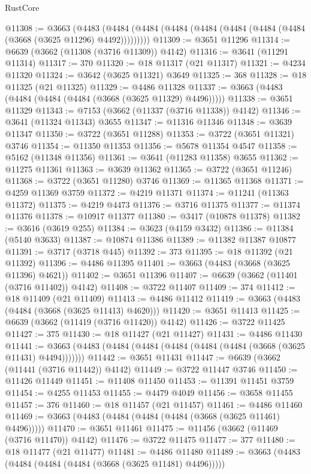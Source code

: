 \begin{lexlean}{RustCore}
\begin{coremodule}
@11308 := @3663
    (@4483 (@4484 (@4484 (@4484 (@4484 (@4484 (@4484 (@4484 (@3668 (@3625 @11296) @4492)))))))))
@11309 := @3651 @11296
@11314 := @6639 (@3662 (@11308 (@3716 @11309)) @4142)
@11316 := @3641 (@11291 @11314)
@11317 := 370
@11320 := @18 @11317 (@21 @11317)
@11321 := @4234 @11320
@11324 := @3642 (@3625 @11321) @3649
@11325 := 368
@11328 := @18 @11325 (@21 @11325)
@11329 := @4486 @11328
@11337 := @3663 (@4483 (@4484 (@4484 (@4484 (@3668 (@3625 @11329) @4496)))))
@11338 := @3651 @11329
@11343 := @7153 (@3662 (@11337 (@3716 @11338)) @4142)
@11346 := @3641 (@11324 @11343) @3655
@11347 := @11316 @11346
@11348 := @3639 @11347
@11350 := @3722 (@3651 @11288)
@11353 := @3722 (@3651 @11321) @3746
@11354 := @11350 @11353
@11356 := @5678 @11354 @4547
@11358 := @5162 (@11348 @11356)
@11361 := @3641 (@11283 @11358) @3655
@11362 := @11275 @11361
@11363 := @3639 @11362
@11365 := @3722 (@3651 @11246)
@11368 := @3722 (@3651 @11280) @3746
@11369 := @11365 @11368
@11371 := @4259 @11369 @3759
@11372 := @4219 @11371
@11374 := @11241 (@11363 @11372)
@11375 := @4219 @4473
@11376 := @3716 @11375
@11377 := @11374 @11376
@11378 := @10917 @11377
@11380 := @3417 (@10878 @11378)
@11382 := @3616 (@3619 @255)
@11384 := @3623 (@4159 @3432)
@11386 := @11384 (@5140 @3633)
@11387 := @10874 @11386
@11389 := @11382 @11387 @10877
@11391 := @3717 (@3718 @445)
@11392 := 373
@11395 := @18 @11392 (@21 @11392)
@11396 := @4486 @11395
@11401 := @3663 (@4483 (@3668 (@3625 @11396) @4621))
@11402 := @3651 @11396
@11407 := @6639 (@3662 (@11401 (@3716 @11402)) @4142)
@11408 := @3722 @11407
@11409 := 374
@11412 := @18 @11409 (@21 @11409)
@11413 := @4486 @11412
@11419 := @3663 (@4483 (@4484 (@3668 (@3625 @11413) @4620)))
@11420 := @3651 @11413
@11425 := @6639 (@3662 (@11419 (@3716 @11420)) @4142)
@11426 := @3722 @11425
@11427 := 375
@11430 := @18 @11427 (@21 @11427)
@11431 := @4486 @11430
@11441 := @3663 (@4483 (@4484 (@4484 (@4484 (@4484 (@4484 (@3668 (@3625 @11431) @4494)))))))
@11442 := @3651 @11431
@11447 := @6639 (@3662 (@11441 (@3716 @11442)) @4142)
@11449 := @3722 @11447 @3746
@11450 := @11426 @11449
@11451 := @11408 @11450
@11453 := @11391 @11451 @3759
@11454 := @4255 @11453
@11455 := @4479 @4049
@11456 := @3658 @11455
@11457 := 376
@11460 := @18 @11457 (@21 @11457)
@11461 := @4486 @11460
@11469 := @3663 (@4483 (@4484 (@4484 (@4484 (@3668 (@3625 @11461) @4496)))))
@11470 := @3651 @11461
@11475 := @11456 (@3662 (@11469 (@3716 @11470)) @4142)
@11476 := @3722 @11475
@11477 := 377
@11480 := @18 @11477 (@21 @11477)
@11481 := @4486 @11480
@11489 := @3663 (@4483 (@4484 (@4484 (@4484 (@3668 (@3625 @11481) @4496)))))

\end{coremodule}
\end{lexlean}
